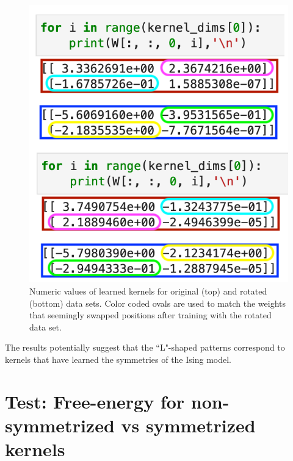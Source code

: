 \documentclass[12pt]{article}
\begin{document}
\begin{figure}[t!]
\begin{center}
    \includegraphics[width=1.0\columnwidth]{figures/learned_kernels_2by2_combined_numeric.png}
\end{center}
\caption{Numeric values of learned kernels for original (top) and rotated (bottom) data sets. Color coded ovals are used to match the weights that seemingly swapped positions after training with the rotated data set.}
\label{fig:2by2_kernels_numeric}
\end{figure}

The results potentially suggest that the ``L"-shaped patterns correspond to kernels that have learned the symmetries of the Ising model.

\newcommand{\sectionbreak}{\clearpage}
\section{Test: Free-energy for non-symmetrized vs symmetrized kernels}
\end{document}
